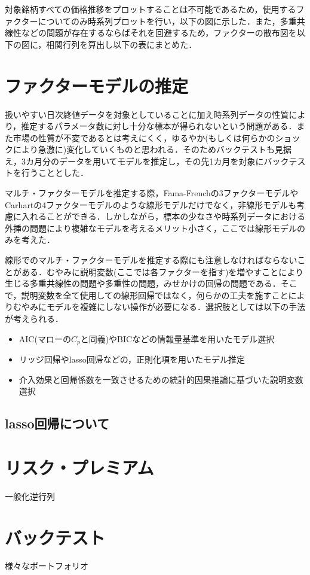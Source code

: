 \documentclass[11pt]{jreport}
\begin{document}
対象銘柄すべての価格推移をプロットすることは不可能であるため，使用するファクターについてのみ時系列プロットを行い，以下の図に示した．また，多重共線性などの問題が存在するならばそれを回避するため，ファクターの散布図を以下の図に，相関行列を算出し以下の表にまとめた．
\section{ファクターモデルの推定}
扱いやすい日次終値データを対象としていることに加え時系列データの性質により，推定するパラメータ数に対し十分な標本が得られないという問題がある．また市場の性質が不変であるとは考えにくく，ゆるやか(もしくは何らかのショックにより急激に)変化していくものと思われる．そのためバックテストも見据え，3カ月分のデータを用いてモデルを推定し，その先1カ月を対象にバックテストを行うこととした．

マルチ・ファクターモデルを推定する際，Fama-Frenchの3ファクターモデルやCarhartの4ファクターモデルのような線形モデルだけでなく，非線形モデルも考慮に入れることができる．しかしながら，標本の少なさや時系列データにおける外挿の問題により複雑なモデルを考えるメリット小さく，ここでは線形モデルのみを考えた．

線形でのマルチ・ファクターモデルを推定する際にも注意しなければならないことがある．むやみに説明変数(ここでは各ファクターを指す)を増やすことにより生じる多重共線性の問題や多重性の問題，みせかけの回帰の問題である．そこで，説明変数を全て使用しての線形回帰ではなく，何らかの工夫を施すことによりむやみにモデルを複雑にしない操作が必要になる．選択肢としては以下の手法が考えられる．

\begin{itemize}
\item AIC(マローの$C_p$と同義)やBICなどの情報量基準を用いたモデル選択
\item リッジ回帰やlasso回帰などの，正則化項を用いたモデル推定
\item 介入効果と回帰係数を一致させるための統計的因果推論に基づいた説明変数選択
\end{itemize}

\subsection{lasso回帰について}
\section{リスク・プレミアム}
一般化逆行列
\section{バックテスト}
様々なポートフォリオ
\end{document}

